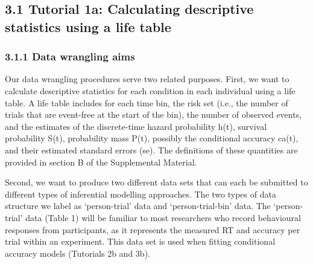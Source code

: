 \documentclass[
  man, donotrepeattitle,floatsintext]{apa6}
\begin{document}
\subsection{3.1 Tutorial 1a: Calculating descriptive statistics using a life table}\label{tutorial-1a-calculating-descriptive-statistics-using-a-life-table}

\subsubsection{3.1.1 Data wrangling aims}\label{data-wrangling-aims}

Our data wrangling procedures serve two related purposes. First, we want to calculate descriptive statistics for each condition in each individual using a life table. A life table includes for each time bin, the risk set (i.e., the number of trials that are event-free at the start of the bin), the number of observed events, and the estimates of the discrete-time hazard probability h(t), survival probability S(t), probability mass P(t), possibly the conditional accuracy ca(t), and their estimated standard errors (se). The definitions of these quantities are provided in section B of the Supplemental Material.

Second, we want to produce two different data sets that can each be submitted to different types of inferential modelling approaches. The two types of data structure we label as `person-trial' data and `person-trial-bin' data. The `person-trial' data (Table 1) will be familiar to most researchers who record behavioural responses from participants, as it represents the measured RT and accuracy per trial within an experiment. This data set is used when fitting conditional accuracy models (Tutorials 2b and 3b).
\end{document}
